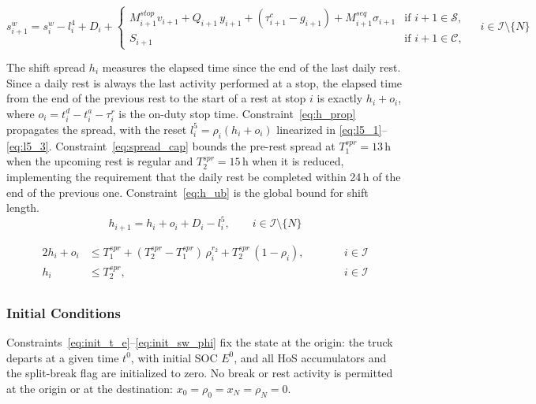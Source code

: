 \documentclass[preprint,12pt,3p]{elsarticle}
\begin{document}
\begin{equation}
    s_{i+1}^w = s_i^w - l_i^4 + D_i
    + \begin{cases}
         M_{i+1}^{stop} v_{i+1} + Q_{i+1}\, y_{i+1} + (\tau^c_{i+1} - g_{i+1}) + M_{i+1}^{seq} \sigma_{i+1}  & \text{if } i+1 \in \mathcal{S}, \\
        S_{i+1}                      & \text{if } i+1 \in \mathcal{C},
    \end{cases}
    \quad \, i \in \mathcal{I}\setminus\{N\}
    \label{eq:sw_prop}
\end{equation}


The shift spread $h_i$ measures the elapsed time since the end of the last daily rest. Since a daily rest is always the last activity performed at a stop, the elapsed time from the end of the previous rest to the start of a rest at stop $i$ is exactly $h_i + o_i$, where $o_i = t^d_i - t^a_i - \tau^r_i$ is the on-duty stop time. Constraint~\eqref{eq:h_prop} propagates the spread, with the reset $l^5_i = \rho_i (h_i + o_i)$ linearized in \eqref{eq:l5_1}--\eqref{eq:l5_3}. Constraint~\eqref{eq:spread_cap} bounds the pre-rest spread at $T^{spr}_1 = 13$\,h when the upcoming rest is regular and $T^{spr}_2 = 15$\,h when it is reduced, implementing the requirement that the daily rest be completed within 24\,h of the end of the previous one. Constraint~\eqref{eq:h_ub} is the global bound for shift length.
\begin{equation}
    h_{i+1} = h_i + o_i + D_i - l^5_i, \qquad i \in \mathcal I \setminus \{N\}
    \label{eq:h_prop}
\end{equation}

\begin{alignat}{2}
    h_i + o_i &\leq T^{spr}_1 + (T^{spr}_2 - T^{spr}_1)\,\rho^{r_2}_i + T^{spr}_2\,(1 - \rho_i), &\qquad& i \in \mathcal I \label{eq:spread_cap}\\
    h_i &\leq T^{spr}_2, &\qquad& i \in \mathcal I \label{eq:h_ub}\\
\end{alignat}



\subsubsection{Initial Conditions}
Constraints~\eqref{eq:init_t_e}--\eqref{eq:init_sw_phi} fix the state at the origin: the truck departs at a given time $t^0$, with initial SOC $E^0$, and all HoS accumulators and the split-break flag are initialized to zero. No break or rest activity is permitted at the origin or at the destination: $x_0 = \rho_0 = x_N = \rho_N = 0$.
\end{document}
